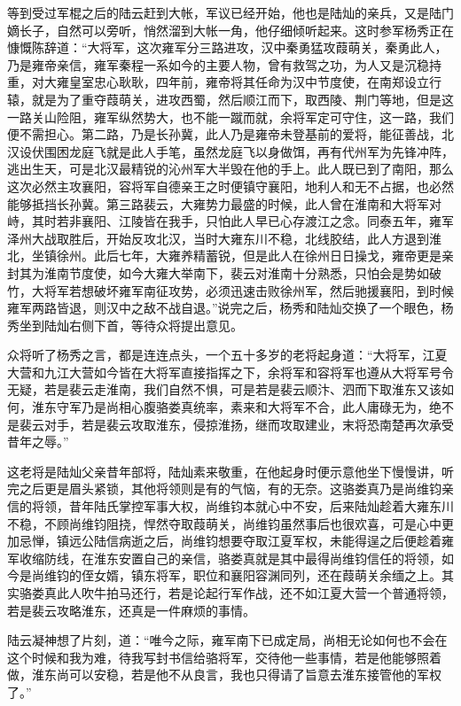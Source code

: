 等到受过军棍之后的陆云赶到大帐，军议已经开始，他也是陆灿的亲兵，又是陆门嫡长子，自然可以旁听，悄然溜到大帐一角，他仔细倾听起来。这时参军杨秀正在慷慨陈辞道：“大将军，这次雍军分三路进攻，汉中秦勇猛攻葭萌关，秦勇此人，乃是雍帝亲信，雍军秦程一系如今的主要人物，曾有救驾之功，为人又是沉稳持重，对大雍皇室忠心耿耿，四年前，雍帝将其任命为汉中节度使，在南郑设立行辕，就是为了重夺葭萌关，进攻西蜀，然后顺江而下，取西陵、荆门等地，但是这一路关山险阻，雍军纵然势大，也不能一蹴而就，余将军定可守住，这一路，我们便不需担心。第二路，乃是长孙冀，此人乃是雍帝未登基前的爱将，能征善战，北汉设伏围困龙庭飞就是此人手笔，虽然龙庭飞以身做饵，再有代州军为先锋冲阵，逃出生天，可是北汉最精锐的沁州军大半毁在他的手上。此人既已到了南阳，那么这次必然主攻襄阳，容将军自德亲王之时便镇守襄阳，地利人和无不占据，也必然能够抵挡长孙冀。第三路裴云，大雍势力最盛的时候，此人曾在淮南和大将军对峙，其时若非襄阳、江陵皆在我手，只怕此人早已心存渡江之念。同泰五年，雍军泽州大战取胜后，开始反攻北汉，当时大雍东川不稳，北线胶结，此人方退到淮北，坐镇徐州。此后七年，大雍养精蓄锐，但是此人在徐州日日操戈，雍帝更是亲封其为淮南节度使，如今大雍大举南下，裴云对淮南十分熟悉，只怕会是势如破竹，大将军若想破坏雍军南征攻势，必须迅速击败徐州军，然后驰援襄阳，到时候雍军两路皆退，则汉中之敌不战自退。”说完之后，杨秀和陆灿交换了一个眼色，杨秀坐到陆灿右侧下首，等待众将提出意见。

众将听了杨秀之言，都是连连点头，一个五十多岁的老将起身道：“大将军，江夏大营和九江大营如今皆在大将军直接指挥之下，余将军和容将军也遵从大将军号令无疑，若是裴云走淮南，我们自然不惧，可是若是裴云顺汴、泗而下取淮东又该如何，淮东守军乃是尚相心腹骆娄真统率，素来和大将军不合，此人庸碌无为，绝不是裴云对手，若是裴云攻取淮东，侵掠淮扬，继而攻取建业，末将恐南楚再次承受昔年之辱。”

这老将是陆灿父亲昔年部将，陆灿素来敬重，在他起身时便示意他坐下慢慢讲，听完之后更是眉头紧锁，其他将领则是有的气恼，有的无奈。这骆娄真乃是尚维钧亲信的将领，昔年陆氏掌控军事大权，尚维钧本就心中不安，后来陆灿趁着大雍东川不稳，不顾尚维钧阻挠，悍然夺取葭萌关，尚维钧虽然事后也很欢喜，可是心中更加忌惮，镇远公陆信病逝之后，尚维钧想要夺取江夏军权，未能得逞之后便趁着雍军收缩防线，在淮东安置自己的亲信，骆娄真就是其中最得尚维钧信任的将领，如今是尚维钧的侄女婿，镇东将军，职位和襄阳容渊同列，还在葭萌关余缅之上。其实骆娄真此人吹牛拍马还行，若是论起行军作战，还不如江夏大营一个普通将领，若是裴云攻略淮东，还真是一件麻烦的事情。

陆云凝神想了片刻，道：“唯今之际，雍军南下已成定局，尚相无论如何也不会在这个时候和我为难，待我写封书信给骆将军，交待他一些事情，若是他能够照着做，淮东尚可以安稳，若是他不从良言，我也只得请了旨意去淮东接管他的军权了。”

